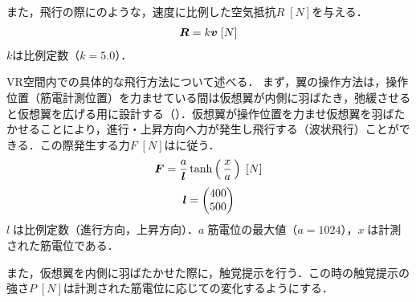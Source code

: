         また，飛行の際にのような，速度に比例した空気抵抗$R\;[N]$を与える．
        \begin{eqnarray}
                \equlabel{air_resistance}
                \bm{R}=k\bm{v} \;[N]
        \end{eqnarray}
        $k$は比例定数（$k=5.0$）．


        VR空間内での具体的な飛行方法について述べる．
        まず，翼の操作方法は，操作位置（筋電計測位置）を力ませている間は仮想翼が内側に羽ばたき，弛緩させると仮想翼を広げる用に設計する（）．仮想翼が操作位置を力ませ仮想翼を羽ばたかせることにより，進行・上昇方向へ力が発生し飛行する（波状飛行\cite{bird-flying}）ことができる．この際発生する力$F\;[N]$はに従う．
        \begin{eqnarray}
                \equlabel{force}
                \bm{F}=\frac{a}{\bm{l}}  \tanh\left(\,\frac{x}{a}\,\right) \;[N]
        \end{eqnarray}
        \begin{eqnarray}
                \equlabel{force_prop}
                \bm{l}=\begin{pmatrix}400 \\ 500 \end{pmatrix}
        \end{eqnarray}
        $l\;$は比例定数（進行方向，上昇方向）．$a\;$筋電位の最大値（$a=1024$），$x\;$は計測された筋電位である．

        また，仮想翼を内側に羽ばたかせた際に，触覚提示を行う．この時の触覚提示の強さ$P\;[N]$は計測された筋電位に応じての変化するようにする．
        
